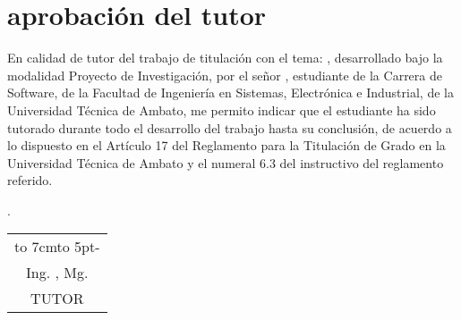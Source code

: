 \chapter*{aprobación del tutor}

En calidad de tutor del trabajo de titulación con el tema:
{\MakeUppercase\tema},
desarrollado bajo
la modalidad Proyecto de Investigación, por el señor \autor,
estudiante de la Carrera de Software, de la Facultad de Ingeniería en Sistemas, Electrónica e Industrial, de la
Universidad Técnica de Ambato, me permito indicar que el estudiante ha sido tutorado
durante todo el desarrollo del trabajo hasta su conclusión, de acuerdo a lo dispuesto en
el Artículo 17 del Reglamento para la Titulación de Grado en la Universidad Técnica
de Ambato y el numeral 6.3 del instructivo del reglamento referido.

\begin{flushright}
	\lugarFechaPrelims.
\end{flushright}

\vspace*{5cm}
\begin{center}
	\begin{tabular}{c}
		\hbox to 7cm{\leaders\hbox to 5pt{\hss - \hss}\hfil} \\
		Ing. \tutor, Mg.\\
		TUTOR
	\end{tabular}
\end{center}
